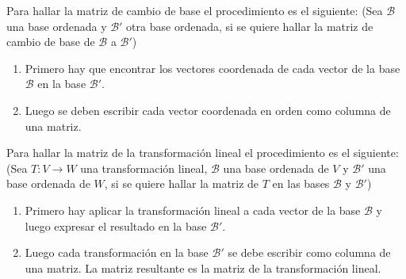 \documentclass[a4,10pt]{aleph-notas}
\begin{document}
\begin{obs}
    Para hallar la matriz de cambio de base el procedimiento es el siguiente: (Sea $\mathcal{B}$ una base ordenada y $\mathcal{B}'$ otra base ordenada, si se quiere hallar la matriz de cambio de base de $\mathcal{B}$ a $\mathcal{B}'$)
    \begin{enumerate}
        \item Primero hay que encontrar los vectores coordenada de cada vector de la base $\mathcal{B}$ en la base $\mathcal{B}'$.
        \item Luego se deben escribir cada vector coordenada en orden como columna de una matriz.
    \end{enumerate}
\end{obs}

\begin{obs}
    Para hallar la matriz de la transformación lineal el procedimiento es el siguiente: (Sea $T:V\to W$ una transformación lineal, $\mathcal{B}$ una base ordenada de $V$ y $\mathcal{B}'$ una base ordenada de $W$, si se quiere hallar la matriz de $T$ en las bases $\mathcal{B}$ y $\mathcal{B}'$)
    \begin{enumerate}
        \item Primero hay aplicar la transformación lineal a cada vector de la base $\mathcal{B}$ y luego expresar el resultado en la base $\mathcal{B}'$.
        \item Luego cada transformación en la base $\mathcal{B}'$ se debe escribir como columna de una matriz. La matriz resultante es la matriz de la transformación lineal.
    \end{enumerate}
\end{obs}
\end{document}
